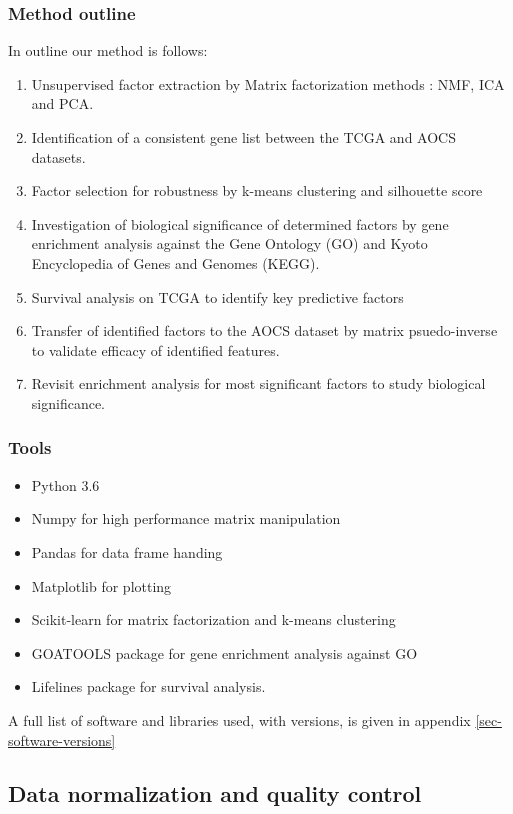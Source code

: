 \documentclass[tikz, 12pt,a4paper,oneside,fleqn]{article}
\begin{document}
\subsubsection{Method outline}
In outline our method is follows:
\begin{enumerate}
\item
Unsupervised factor extraction by Matrix
factorization methods : NMF, ICA and PCA.
\item
Identification of a consistent gene list between the TCGA and AOCS datasets.
\item
Factor selection for robustness by
k-means clustering and silhouette score
\item
Investigation of biological significance of determined factors by gene enrichment analysis against the Gene Ontology (GO) and Kyoto Encyclopedia of Genes and Genomes (KEGG).
\item
Survival analysis on TCGA to identify key predictive factors
\item
Transfer of identified factors to the AOCS dataset by matrix psuedo-inverse to validate efficacy of identified features.
\item
Revisit enrichment analysis for most significant factors to study biological significance.
\end{enumerate}

\subsubsection{Tools}
\begin{itemize}
\item Python 3.6
\item Numpy for high performance matrix manipulation
\item Pandas for data frame handing
\item Matplotlib for plotting
\item Scikit-learn for matrix factorization and k-means clustering
\item GOATOOLS package for gene enrichment analysis against GO
\item Lifelines package for survival analysis.
\end{itemize}

A full list of software and libraries used, with versions, is given in appendix \ref{sec-software-versions}

\subsection{Data normalization and quality control}
\end{document}
